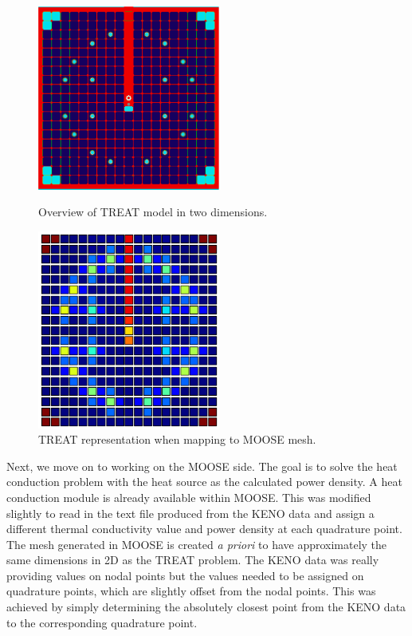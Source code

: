 \documentclass[11pt]{article}
\begin{document}
\begin{figure}
\centering
\begin{minipage}{.5\textwidth}
    \centering
    \includegraphics[width=6cm]{figures/treat_top_view.png}
    \caption{Overview of TREAT model in two dimensions.}
    \label{fig:treat2d}
\end{minipage}%
\begin{minipage}{.5\textwidth}
  \centering
  \includegraphics[width=6cm]{figures/simple-treat.png}
  \caption{TREAT representation when mapping to MOOSE mesh.}
  \label{fig:simpletreat}
\end{minipage}
\end{figure}


	Next, we move on to working on the MOOSE side.  The goal is to solve the heat conduction problem with the heat source as the calculated power density. A heat conduction module is already available within MOOSE.  This was modified slightly to read in the text file produced from the KENO data and assign a different thermal conductivity value and power density at each quadrature point.  The mesh generated in MOOSE is created \emph{a priori} to have approximately the same dimensions in 2D as the TREAT problem.  The KENO data was really providing values on nodal points but the values needed to be assigned on quadrature points, which are slightly offset from the nodal points.  This was achieved by simply determining the absolutely closest point from the KENO data to the corresponding quadrature point. 
	
\end{document}
